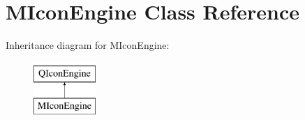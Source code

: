 \hypertarget{class_m_icon_engine}{}\section{M\+Icon\+Engine Class Reference}
\label{class_m_icon_engine}
Inheritance diagram for M\+Icon\+Engine\+:\begin{figure}[H]
\begin{center}
\leavevmode
\includegraphics[height=2.000000cm]{class_m_icon_engine}
\end{center}
\end{figure}
